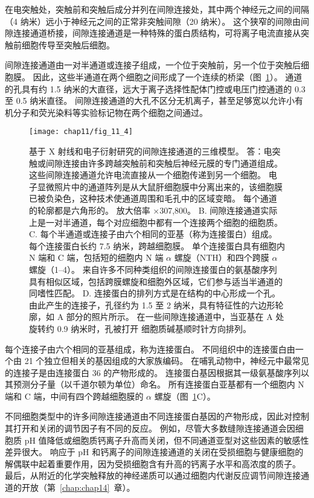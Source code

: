在电突触处，突触前和突触后成分并列在间隙连接处，其中两个神经元之间的间隔（4 纳米）远小于神经元之间的正常非突触间隙（20 纳米）。
这个狭窄的间隙由间隙连接通道桥接，间隙连接通道是一种特殊的蛋白质结构，可将离子电流直接从突触前细胞传导至突触后细胞。


间隙连接通道由一对半通道或连接子组成，一个位于突触前，另一个位于突触后细胞膜。
因此，这些半通道在两个细胞之间形成了一个连续的桥梁（图~\ref{fig:11_4}）。
通道的孔具有约 1.5 纳米的大直径，远大于离子选择性配体门控或电压门控通道的 0.3 至 0.5 纳米直径。
间隙连接通道的大孔不区分无机离子，甚至足够宽以允许小有机分子和荧光染料等实验标记物在两个细胞之间通过。


\begin{figure}[htbp]
	\centering
	\texttt{[image: chap11/fig\_11\_4]}
	\caption{基于 X 射线和电子衍射研究的间隙连接通道的三维模型。
		答：电突触或间隙连接由许多跨越突触前和突触后神经元膜的专门通道组成。
		这些间隙连接通道允许电流直接从一个细胞传递到另一个细胞。
		电子显微照片中的通道阵列是从大鼠肝细胞膜中分离出来的，该细胞膜已被负染色，这种技术使通道周围和毛孔中的区域变暗。
		每个通道的轮廓都是六角形的。
		放大倍率 ×307,800。
		B. 间隙连接通道实际上是一对半通道，每个对应细胞中都有一个连接两个细胞的细胞质\cite{makowski1977gap}。 
		C. 每个半通道或连接子由六个相同的亚基（称为连接蛋白）组成。
		每个连接蛋白长约 7.5 纳米，跨越细胞膜。
		单个连接蛋白具有细胞内 N 端和 C 端，包括短的细胞内 N 端 $\alpha$ 螺旋（NTH）和四个跨膜 $\alpha$ 螺旋（1–4）。
		来自许多不同种类组织的间隙连接蛋白的氨基酸序列具有相似区域，包括跨膜螺旋和细胞外区域，它们参与适当半通道的同嗜性匹配。
		D. 连接蛋白的排列方式是在结构的中心形成一个孔。
		由此产生的连接子，孔径约为 1.5 至 2 纳米，具有特征性的六边形轮廓，如 A 部分的照片所示。
		在一些间隙连接通道中，当亚基在 A 处旋转约 0.9 纳米时，孔被打开 细胞质碱基顺时针方向排列\cite{unwin1980structure}。}
	\label{fig:11_4}
\end{figure}


每个连接子由六个相同的亚基组成，称为连接蛋白。
不同组织中的连接蛋白由一个由 21 个独立但相关的基因组成的大家族编码。
在哺乳动物中，神经元中最常见的连接子是由连接蛋白 36 的产物形成的。
连接蛋白基因根据其一级氨基酸序列以其预测分子量（以千道尔顿为单位）命名。
所有连接蛋白亚基都有一个细胞内 N 端和 C 端，中间有四个跨越细胞膜的 $\alpha$ 螺旋（图~\ref{fig:11_4}C）。


不同细胞类型中的许多间隙连接通道由不同连接蛋白基因的产物形成，因此对控制其打开和关闭的调节因子有不同的反应。
例如，尽管大多数缝隙连接通道会因细胞质 pH 值降低或细胞质钙离子升高而关闭，但不同通道亚型对这些因素的敏感性差异很大。
响应于 pH 和钙离子的间隙连接通道的关闭在受损细胞与健康细胞的解偶联中起着重要作用，因为受损细胞含有升高的钙离子水平和高浓度的质子。
最后，从附近的化学突触释放的神经递质可以通过细胞内代谢反应调节间隙连接通道的开放（第~\ref{chap:chap14}~章）。


